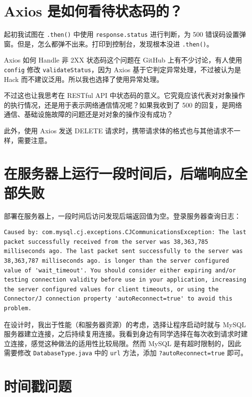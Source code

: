 \documentclass[a4paper,oneside]{ctexbook}
\begin{document}
\section{Axios 是如何看待状态码的？}

起初我试图在 \verb|.then()| 中使用 \verb|response.status| 进行判断，为 500 错误码设置弹窗。但是，怎么都弹不出来。打印到控制台，发现根本没进 \verb|.then()|。

Axios 如何 Handle 非 2XX 状态码这个问题在 GitHub 上有不少讨论，有人使用 \verb|config| 修改 \verb|validateStatus|，因为 Axios 基于它判定异常处理，不过被认为是 Hack 而不建议泛用。所以我也选择了使用异常处理。\cite{Ijaz}

不过这也让我思考在 RESTful API 中状态码的意义。它究竟应该代表对对象操作的执行情况，还是用于表示网络通信情况呢？如果我收到了 500 的回复，是网络通信、基础设施故障的问题还是对对象的操作没有成功？

此外，使用 Axios 发送 DELETE 请求时，携带请求体的格式也与其他请求不一样，需要注意。\cite{Axios}

\section{在服务器上运行一段时间后，后端响应全部失败}

部署在服务器上，一段时间后访问发现后端返回值为空。登录服务器查询日志：

\begin{lstlisting}[caption=日志,label=lst:log-long]
Caused by: com.mysql.cj.exceptions.CJCommunicationsException: The last packet successfully received from the server was 38,363,785 milliseconds ago. The last packet sent successfully to the server was 38,363,787 milliseconds ago. is longer than the server configured value of 'wait_timeout'. You should consider either expiring and/or testing connection validity before use in your application, increasing the server configured values for client timeouts, or using the Connector/J connection property 'autoReconnect=true' to avoid this problem.
\end{lstlisting}

在设计时，我出于性能（和服务器资源）的考虑，选择让程序启动时就与 MySQL 服务器建立连接，之后持续复用连接。我看到身边有同学选择在每次收到请求时建立连接，感觉这种做法的适用性比较局限。然而 MySQL 是有超时限制的，因此需要修改 \verb|DatabaseType.java| 中的 \verb|url| 方法，添加 \verb|?autoReconnect=true| 即可。

\section{时间戳问题}
\end{document}
